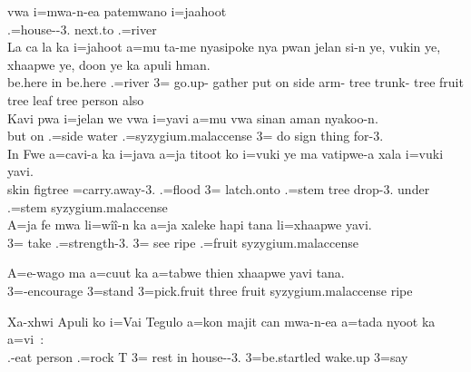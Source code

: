 \ea
\gll vwa i=mwa-n-ea patemwano i=jaahoot\\  .=house--3. next.to .=river\\ \glt {}
\ex
\gll La ca la ka i=jahoot a=mu ta-me nyasipoke nya pwan jelan si-n ye, vukin ye, xhaapwe ye, doon ye ka apuli hman.\\ be.here in be.here  .=river 3= go.up- gather put on side arm- tree trunk- tree fruit tree leaf tree  person also\\ \glt {}
\ex
\gll Kavi pwa i=jelan we vwa i=yavi a=mu vwa sinan aman nyakoo-n.\\ but on .=side water  .=syzygium.malaccense 3= do sign thing for-3.\\ \glt {}
\ex
\gll In Fwe a=cavi-a ka i=java a=ja titoot ko i=vuki ye ma vatipwe-a xala i=vuki yavi.\\ skin figtree =carry.away-3.  .=flood 3= latch.onto  .=stem tree  drop-3. under .=stem syzygium.malaccense\\ \glt  {}
\ex
\gll A=ja fe mwa li=wîî-n ka a=ja xaleke hapi tana li=xhaapwe yavi.\\ 3= take  .=strength-3.  3= see  ripe .=fruit syzygium.malaccense\\ \glt  {} 
\z

\ea
\gll A=e-wago ma a=cuut ka a=tabwe thien xhaapwe yavi tana.\\ 3=-encourage  3=stand  3=pick.fruit three fruit syzygium.malaccense ripe\\ \glt {}
\z

\ea
\gll Xa-xhwi Apuli ko i=Vai Tegulo a=kon majit can mwa-n-ea a=tada nyoot ka a=vi :\\ .-eat person  .=rock T 3= rest in house--3. 3=be.startled wake.up  3=say\\ \glt  {}
\z

